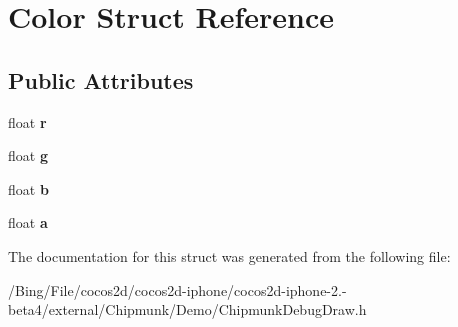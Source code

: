 \hypertarget{struct_color}{\section{Color Struct Reference}
\label{struct_color}
}
\subsection*{Public Attributes}
\begin{DoxyCompactItemize}
\item 
\hypertarget{struct_color_a3958a556b47d2de3dd45c75aac833c20}{float {\bfseries r}}\label{struct_color_a3958a556b47d2de3dd45c75aac833c20}

\item 
\hypertarget{struct_color_a5defbb21620e480e556181772d665f34}{float {\bfseries g}}\label{struct_color_a5defbb21620e480e556181772d665f34}

\item 
\hypertarget{struct_color_a33e482be18d6ea31d2b403bee13683b7}{float {\bfseries b}}\label{struct_color_a33e482be18d6ea31d2b403bee13683b7}

\item 
\hypertarget{struct_color_a98047aee65fc3d825f88a76da728fd27}{float {\bfseries a}}\label{struct_color_a98047aee65fc3d825f88a76da728fd27}

\end{DoxyCompactItemize}


The documentation for this struct was generated from the following file\-:\begin{DoxyCompactItemize}
\item 
/\-Bing/\-File/cocos2d/cocos2d-\/iphone/cocos2d-\/iphone-\/2.-\/beta4/external/\-Chipmunk/\-Demo/Chipmunk\-Debug\-Draw.\-h\end{DoxyCompactItemize}
